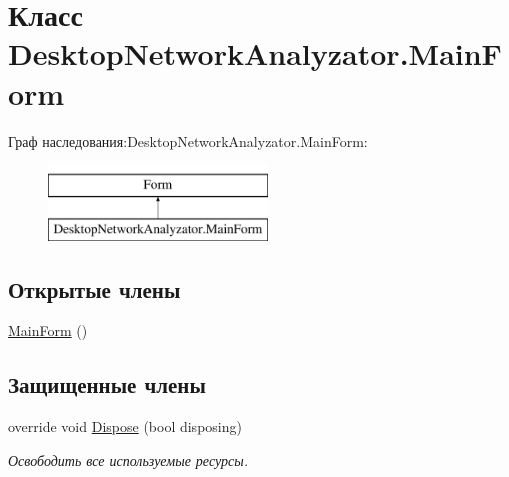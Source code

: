 \hypertarget{class_desktop_network_analyzator_1_1_main_form}{}\section{Класс Desktop\+Network\+Analyzator.\+Main\+Form}
\label{class_desktop_network_analyzator_1_1_main_form}
Граф наследования\+:Desktop\+Network\+Analyzator.\+Main\+Form\+:\begin{figure}[H]
\begin{center}
\leavevmode
\includegraphics[height=2.000000cm]{class_desktop_network_analyzator_1_1_main_form}
\end{center}
\end{figure}
\subsection*{Открытые члены}
\begin{DoxyCompactItemize}
\item 
\hyperlink{class_desktop_network_analyzator_1_1_main_form_afe17fac50a2899e29e5a15940c2b2793}{Main\+Form} ()
\end{DoxyCompactItemize}
\subsection*{Защищенные члены}
\begin{DoxyCompactItemize}
\item 
override void \hyperlink{class_desktop_network_analyzator_1_1_main_form_a48384182a9206f71b1e5ae9d53d80df0}{Dispose} (bool disposing)
\begin{DoxyCompactList}\small\item\em Освободить все используемые ресурсы. \end{DoxyCompactList}\end{DoxyCompactItemize}

